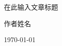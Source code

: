 \begin{titlepage}
    \centering
    \vspace*{3cm} %
    
    {\heiti 在此输入文章标题 \par} %
    
    \vfill %
    
    {\songti 作者姓名 \par} %
    \vspace{0.5cm} %
    {\songti \today \par} %
    
    \vspace*{3cm} %
\end{titlepage}